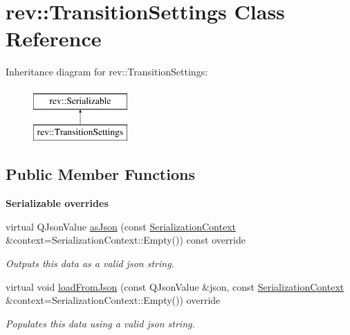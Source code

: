 \hypertarget{classrev_1_1_transition_settings}{}\section{rev\+::Transition\+Settings Class Reference}
\label{classrev_1_1_transition_settings}
Inheritance diagram for rev\+::Transition\+Settings\+:\begin{figure}[H]
\begin{center}
\leavevmode
\includegraphics[height=2.000000cm]{classrev_1_1_transition_settings}
\end{center}
\end{figure}
\subsection*{Public Member Functions}
\begin{Indent}\textbf{ Serializable overrides}\par
\begin{DoxyCompactItemize}
\item 
\mbox{\label{classrev_1_1_transition_settings_ade0d97617b9cb60130e1be1c4077cc33}} 
virtual Q\+Json\+Value \mbox{\hyperlink{classrev_1_1_transition_settings_ade0d97617b9cb60130e1be1c4077cc33}{as\+Json}} (const \mbox{\hyperlink{structrev_1_1_serialization_context}{Serialization\+Context}} \&context=Serialization\+Context\+::\+Empty()) const override
\begin{DoxyCompactList}\small\item\em Outputs this data as a valid json string. \end{DoxyCompactList}\item 
\mbox{\label{classrev_1_1_transition_settings_aa77f032dad52ad2f66413c60e027e4aa}} 
virtual void \mbox{\hyperlink{classrev_1_1_transition_settings_aa77f032dad52ad2f66413c60e027e4aa}{load\+From\+Json}} (const Q\+Json\+Value \&json, const \mbox{\hyperlink{structrev_1_1_serialization_context}{Serialization\+Context}} \&context=Serialization\+Context\+::\+Empty()) override
\begin{DoxyCompactList}\small\item\em Populates this data using a valid json string. \end{DoxyCompactList}\end{DoxyCompactItemize}
\end{Indent}
